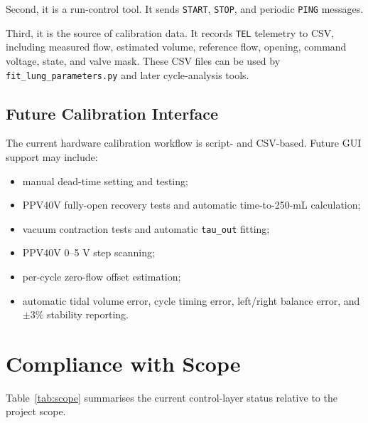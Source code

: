 \documentclass[11pt,a4paper]{article}
\begin{document}
Second, it is a run-control tool. It sends \texttt{START}, \texttt{STOP}, and periodic \texttt{PING} messages.

Third, it is the source of calibration data. It records \texttt{TEL} telemetry to CSV, including measured flow, estimated volume, reference flow, opening, command voltage, state, and valve mask. These CSV files can be used by \texttt{fit\_lung\_parameters.py} and later cycle-analysis tools.

\subsection{Future Calibration Interface}

The current hardware calibration workflow is script- and CSV-based. Future GUI support may include:

\begin{itemize}
  \item manual dead-time setting and testing;
  \item PPV40V fully-open recovery tests and automatic time-to-250-mL calculation;
  \item vacuum contraction tests and automatic \texttt{tau\_out} fitting;
  \item PPV40V 0--5 V step scanning;
  \item per-cycle zero-flow offset estimation;
  \item automatic tidal volume error, cycle timing error, left/right balance error, and $\pm3\%$ stability reporting.
\end{itemize}

\section{Compliance with Scope}

Table~\ref{tab:scope} summarises the current control-layer status relative to the project scope.
\end{document}
